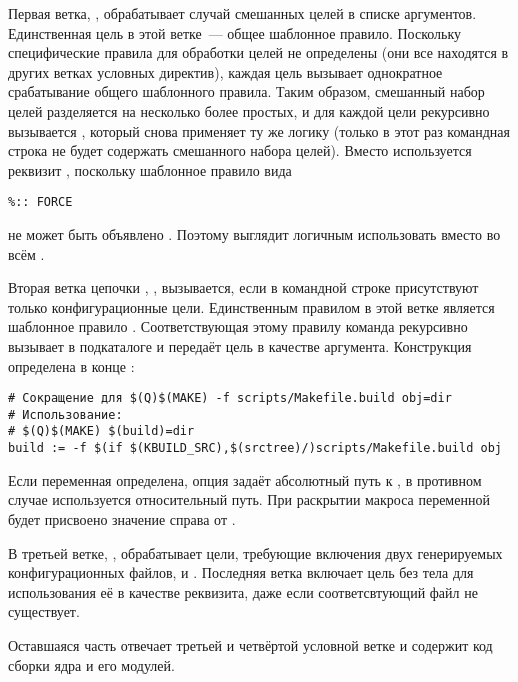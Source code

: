 Первая ветка, , обрабатывает
случай смешанных целей в списке аргументов. Единственная цель в этой
ветке~--- общее шаблонное правило. Поскольку специфические правила для
обработки целей не определены (они все находятся в других ветках
условных директив), каждая цель вызывает однократное срабатывание
общего шаблонного правила. Таким образом, смешанный набор целей
разделяется на несколько более простых, и для каждой цели рекурсивно
вызывается \GNUmake{}, который снова применяет ту же логику (только в
этот раз командная строка не будет содержать смешанного набора
целей). Вместо  используется реквизит ,
поскольку шаблонное правило вида

\begin{verbatim}
%:: FORCE
\end{verbatim}

не может быть объявлено . Поэтому выглядит логичным
использовать  вместо  во всём
.

Вторая ветка цепочки , , вызывается, если в командной строке
присутствуют только конфигурационные цели. Единственным правилом в
этой ветке является шаблонное правило
. Соответствующая этому правилу команда рекурсивно
вызывает \GNUmake{} в подкаталоге  и
передаёт цель в качестве аргумента. Конструкция 
определена в конце :

\begin{verbatim}
# Сокращение для $(Q)$(MAKE) -f scripts/Makefile.build obj=dir
# Использование:
# $(Q)$(MAKE) $(build)=dir
build := -f $(if $(KBUILD_SRC),$(srctree)/)scripts/Makefile.build obj
\end{verbatim}

Если переменная  определена, опция 
задаёт абсолютный путь к , в противном случае используется
относительный путь. При раскрытии макроса переменной 
будет присвоено значение справа от .

В третьей ветке, , обрабатывает цели,
требующие включения двух генерируемых конфигурационных файлов,
 и . Последняя ветка включает
цель без тела  для использования её в качестве
реквизита, даже если соответсвтующий файл не существует.

Оставшаяся часть  отвечает третьей и четвёртой условной
ветке и содержит код сборки ядра и его модулей.

